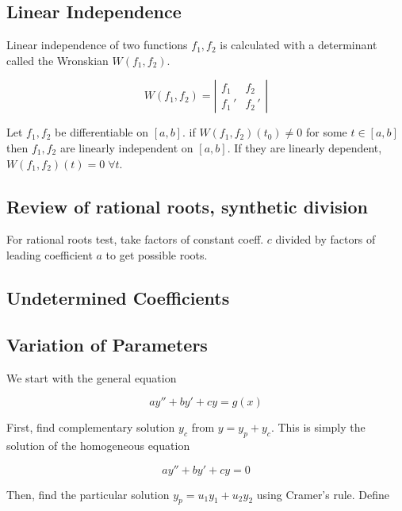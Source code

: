 \subsection{Linear Independence}

Linear independence of two functions $f_1,f_2$ is calculated with a determinant called the Wronskian $W(f_1,f_2)$.

\begin{equation}
    W(f_1,f_2)=\left|\begin{matrix}f_1&f_2\\f_1\,'&f_2\,'\end{matrix}\right|
\end{equation}

Let $f_1,f_2$ be differentiable on $[a,b]$. if $W(f_1,f_2)(t_0)\neq 0$ for some $t\in [a,b]$ then $f_1,f_2$ are linearly independent on $[a,b]$.
If they are linearly dependent, $W(f_1,f_2)(t)=0\;\forall t$.

\subsection{Review of rational roots, synthetic division}

For rational roots test, take factors of constant coeff. $c$ divided by factors of
leading coefficient $a$ to get possible roots.

\subsection{Undetermined Coefficients}



\subsection{Variation of Parameters}

We start with the general equation

\begin{equation}
    ay''+by'+cy=g(x)
\end{equation}

First, find complementary solution $y_c$ from $y=y_p+y_c$. This is simply the solution of the homogeneous equation

\begin{equation}
    ay''+by'+cy=0
\end{equation}

Then, find the particular solution $y_p=u_1y_1+u_2y_2$ using Cramer's rule. Define 

